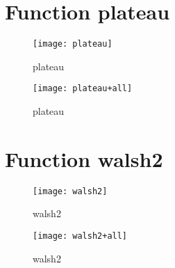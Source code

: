 \newpage

\section{Function plateau}

\begin{center}

\end{center}

\begin{figure}[h]
\begin{center}
\texttt{[image: plateau]}
\caption{plateau}
\end{center}
\end{figure}

\begin{figure}[h]
\begin{center}
\texttt{[image: plateau+all]}
\caption{plateau}
\end{center}
\end{figure}

\newpage

\section{Function walsh2}

\begin{center}

\end{center}

\begin{figure}[h]
\begin{center}
\texttt{[image: walsh2]}
\caption{walsh2}
\end{center}
\end{figure}

\begin{figure}[h]
\begin{center}
\texttt{[image: walsh2+all]}
\caption{walsh2}
\end{center}
\end{figure}

